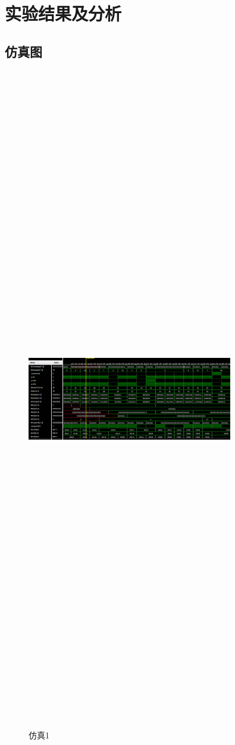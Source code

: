 \section{实验结果及分析}
\subsection{仿真图}
\begin{figure}[htbp]
    \centering
    \includegraphics[width=0.8\textwidth,height=20in,keepaspectratio]{Simulation1.jpg}
    \caption{仿真1}
    \label{image1}
\end{figure}
